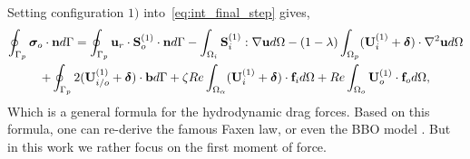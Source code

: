 Setting configuration $1)$ into~\ref{eq:int_final_step} gives, 
\begin{multline}
    \intS[p]{\bm\sigma_{o}\cdot \textbf{n}}
    =
    \intS[p]{\textbf{u}_{r}\cdot \textbf{S}_{o}^{(1)}\cdot \textbf{n}}
    - \intO[i]{ \textbf{S}_{i}^{(1)} :\grad\textbf{u}}
    - (1-\lambda) \intO[p]{(\textbf{U}_{i}^{(1)} + \bm\delta) \cdot \grad^2 \textbf{u} }\\ 
    + \intS[p]{2 (\textbf{U}_{i/o}^{(1)} + \bm\delta) \cdot  \textbf{b}}
    + \zeta Re \intO{(\textbf{U}_{i}^{(1)} + \bm\delta)\cdot \textbf{f}_{i}} 
    + Re\intO[o]{\textbf{U}_{o}^{(1)}\cdot \textbf{f}_{o}},
    \label{eq:drag_force}
\end{multline}
Which is a general formula for the hydrodynamic drag forces. 
Based on this formula, one can re-derive the famous Faxen law, or even the BBO model \citep{kim2013microhydrodynamics}. But in this work we rather focus on the first moment of force. 

